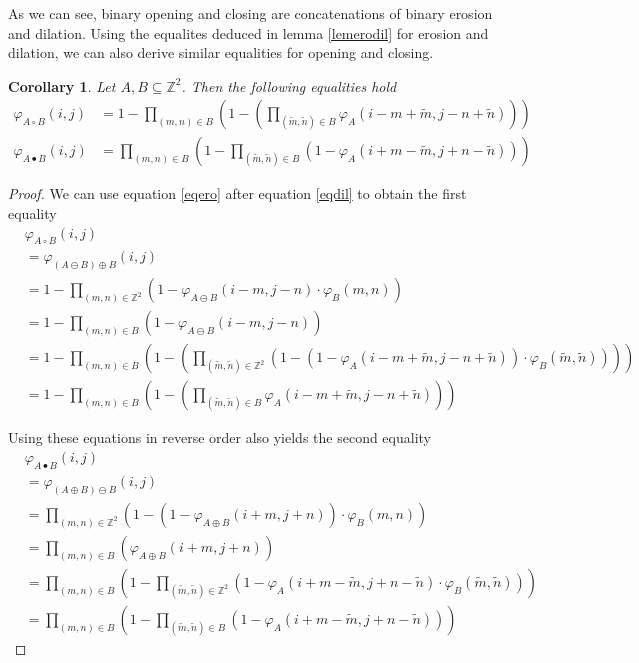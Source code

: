 \documentclass[a4paper,12pt]{article}
\theoremstyle{plain}
\newtheorem{corollary}[theorem]{Corollary}
\theoremstyle{definition}
\theoremstyle{remark}
\begin{document}
As we can see, binary opening and closing are concatenations of binary erosion and dilation. Using the equalites deduced in lemma \ref{lemerodil} for erosion and dilation, we can also derive similar equalities for opening and closing.
\begin{corollary}
	Let $A, B \subseteq \mathbb{Z}^2$. Then the following equalities hold
	\begin{align}
		\varphi_{A \circ B}(i, j) &= 1 - \prod_{(m, n) \in B} \left( 1 - \left( \prod_{(\tilde{m}, \tilde{n}) \in B} \varphi_A(i - m + \tilde{m}, j - n + \tilde{n}) \right) \right) \label{eqopening} \\
		\varphi_{A \bullet B}(i, j) &= \prod_{(m, n) \in B} \left( 1 - \prod_{(\tilde{m}, \tilde{n}) \in B} ( 1 - \varphi_A(i + m - \tilde{m}, j + n - \tilde{n}) ) \right) \label{eqclosing}
	\end{align}
\end{corollary}
\begin{proof}
	We can use equation \eqref{eqero} after equation \eqref{eqdil} to obtain the first equality
	\begin{align*}
		&\varphi_{A \circ B}(i, j) \\
		&= \varphi_{(A \ominus B) \oplus B}(i, j) \\
		&= 1 - \prod_{(m, n) \in \mathbb{Z}^2} ( 1 - \varphi_{A \ominus B}(i - m, j - n) \cdot \varphi_B(m, n) ) \\
		&= 1 - \prod_{(m, n) \in B} ( 1 - \varphi_{A \ominus B}(i - m, j - n) ) \\
		&= 1 - \prod_{(m, n) \in B} \left( 1 - \left( \prod_{(\tilde{m}, \tilde{n}) \in \mathbb{Z}^2} ( 1 - ( 1 - \varphi_A(i - m + \tilde{m}, j - n + \tilde{n}) ) \cdot \varphi_B(\tilde{m}, \tilde{n}) ) \right) \right) \\
		&= 1 - \prod_{(m, n) \in B} \left( 1 - \left( \prod_{(\tilde{m}, \tilde{n}) \in B} \varphi_A(i - m + \tilde{m}, j - n + \tilde{n}) \right) \right)
	\end{align*}
	
	Using these equations in reverse order also yields the second equality
	\begin{align*}
		&\varphi_{A \bullet B}(i, j) \\
		&= \varphi_{(A \oplus B) \ominus B}(i, j) \\
		&= \prod_{(m, n) \in \mathbb{Z}^2} ( 1 - ( 1 - \varphi_{A \oplus B}(i + m, j + n) ) \cdot \varphi_B(m, n) ) \\
		&= \prod_{(m, n) \in B} ( \varphi_{A \oplus B}(i + m, j + n) ) \\
		&= \prod_{(m, n) \in B} \left( 1 - \prod_{(\tilde{m}, \tilde{n}) \in \mathbb{Z}^2} ( 1 - \varphi_A(i + m - \tilde{m}, j + n - \tilde{n}) \cdot \varphi_B(\tilde{m}, \tilde{n}) ) \right) \\
		&= \prod_{(m, n) \in B} \left( 1 - \prod_{(\tilde{m}, \tilde{n}) \in B} ( 1 - \varphi_A(i + m - \tilde{m}, j + n - \tilde{n}) ) \right)
	\end{align*}
\end{proof}
\end{document}
